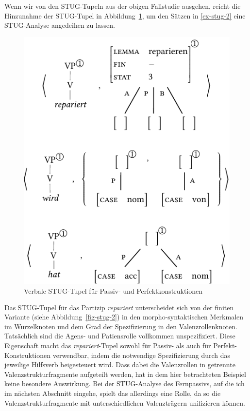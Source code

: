 Wenn wir von den STUG-Tupeln aus der obigen Fallstudie ausgehen, reicht die Hinzunahme der STUG-Tupel in Abbildung~\ref{fig-stug-5}, um den Sätzen in \ref{ex-stug-2} eine STUG-Analyse angedeihen zu lassen.
\begin{figure}[t]
\centering
\includegraphics{graphics/abb95.pdf}
\caption{\label{fig-stug-5}Verbale STUG-Tupel für Passiv- und Perfektkonstruktionen}
\end{figure}
Das STUG-Tupel für das Partizip {\it repariert} unterscheidet sich von der finiten Variante (siehe Abbildung~\ref{fig-stug-2}) in den morpho-syntaktischen Merkmalen im Wurzelknoten und dem Grad der Spezifizierung in den Valenzrollenknoten. Tatsächlich sind die Agens- und Patiensrolle vollkommen unspezifiziert. Diese Eigenschaft macht das {\it repariert}-Tupel sowohl für Passiv- als auch für Perfekt-Konstruktionen verwendbar, indem die notwendige Spezifizierung durch das jeweilige Hilfsverb beigesteuert wird. Dass dabei die Valenzrollen in getrennte Valenzstrukturfragmente aufgeteilt werden, hat in dem hier betrachteten Beispiel keine besondere Auswirkung. Bei der STUG-Analyse des Fernpassivs, auf die ich im nächsten Abschnitt eingehe, spielt das allerdings eine Rolle, da so die Valenzstrukturfragmente mit unterschiedlichen Valenzträgern unifizieren können.  


